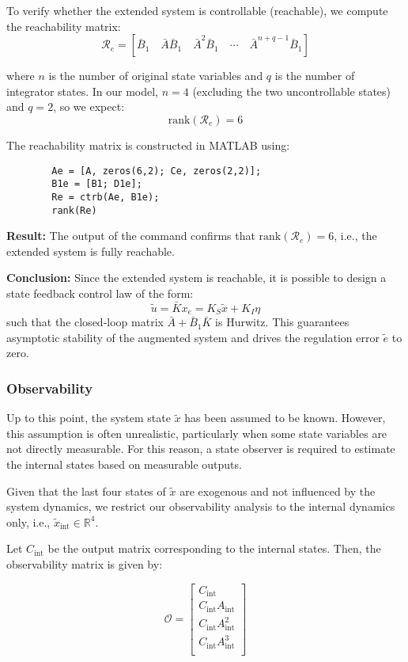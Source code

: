 \documentclass[]{report}
\begin{document}
	To verify whether the extended system is controllable (reachable), we compute the reachability matrix:
	\[
	\mathcal{R}_e = \left[\bar{B}_1 \quad \bar{A}\bar{B}_1 \quad \bar{A}^2\bar{B}_1 \quad \cdots \quad \bar{A}^{n+q-1} \bar{B}_1 \right]
	\]
	
	where $n$ is the number of original state variables and $q$ is the number of integrator states. In our model, $n=4$ (excluding the two uncontrollable states) and $q=2$, so we expect:
	\[
	\text{rank}(\mathcal{R}_e) = 6
	\]
	
	The reachability matrix is constructed in MATLAB using:
	
	\begin{verbatim}
		Ae = [A, zeros(6,2); Ce, zeros(2,2)];
		B1e = [B1; D1e];
		Re = ctrb(Ae, B1e);
		rank(Re)
	\end{verbatim}
	
	\textbf{Result:}  
	The output of the command confirms that $\text{rank}(\mathcal{R}_e) = 6$, i.e., the extended system is fully reachable.
	
	\textbf{Conclusion:}  
	Since the extended system is reachable, it is possible to design a state feedback control law of the form:
	\[
	\tilde{u} = \bar{K} x_e = K_S \tilde{x} + K_I \eta
	\]
	such that the closed-loop matrix $\bar{A} + \bar{B}_1 \bar{K}$ is Hurwitz. This guarantees asymptotic stability of the augmented system and drives the regulation error $\tilde{e}$ to zero.
	
	
	
	\subsubsection{Observability}
	
	Up to this point, the system state $\tilde{x}$ has been assumed to be known. However, this assumption is often unrealistic, particularly when some state variables are not directly measurable. For this reason, a state observer is required to estimate the internal states based on measurable outputs.
	
	Given that the last four states of $\tilde{x}$ are exogenous and not influenced by the system dynamics, we restrict our observability analysis to the internal dynamics only, i.e., $\tilde{x}_{\text{int}} \in \mathbb{R}^4$.
	
	Let $C_{\text{int}}$ be the output matrix corresponding to the internal states. Then, the observability matrix is given by:
	
	\[
	\mathcal{O} = \begin{bmatrix}
		C_{\text{int}} \\
		C_{\text{int}} A_{\text{int}} \\
		C_{\text{int}} A_{\text{int}}^2 \\
		C_{\text{int}} A_{\text{int}}^3 \\
	\end{bmatrix}
	\]
	
\end{document}
